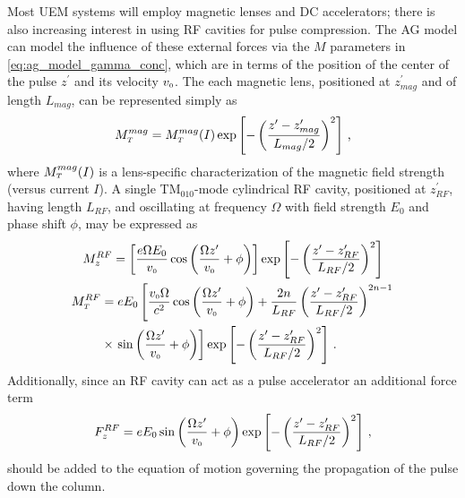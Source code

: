 Most UEM systems will employ magnetic lenses and DC accelerators; there is also increasing interest in using RF cavities for pulse compression.
The AG model can model the influence of these external forces via the $M$ parameters in \ref{eq:ag_model_gamma_conc}, which are in terms of the position of the center of the pulse $z^{\prime}$ and its velocity $v_{{\scriptscriptstyle 0}}$.
The each magnetic lens, positioned at $z_{mag}^{\prime}$ and of length $L_{mag}$, can be represented simply as 
\begin{equation}
  M_{{\scriptscriptstyle T}}^{mag} = M_{{\scriptscriptstyle T}}^{mag}(I) \exp \left [ - \left (  \frac{ z^{\prime} - z_{mag}^{\prime} }{ L_{mag} / 2 } \right )^{ 2 } \right ] \,\text{,}
\end{equation}
where $M_{{\scriptscriptstyle T}}^{mag}(I)$ is a lens-specific characterization of the magnetic field strength (versus current $I$).
A single TM$_{010}$-mode cylindrical RF cavity, positioned at $z_{RF}^{\prime}$, having length $L_{RF}$, and oscillating at frequency $\Omega$ with field strength $E_{0}$ and phase shift $\phi$, may be expressed as
\begin{gather}
  M_{z}^{RF} = \left [ \frac{ e \Omega E_{0} }{ v_{{\scriptscriptstyle 0}} } \cos \left ( \frac{ \Omega z^{\prime} }{ v_{{\scriptscriptstyle 0}} } + \phi \right ) \right ] \exp \left [ - \left (  \frac{ z^{\prime} - z_{RF}^{\prime} }{ L_{RF} / 2 } \right )^{ 2 } \right ] \\
  \begin{aligned}
  M_{{\scriptscriptstyle T}}^{RF} &= e E_{0} \left [ \frac{ v_{{\scriptscriptstyle 0}} \Omega }{c^{2}} \cos \left ( \frac{ \Omega z^{\prime} }{ v_{{\scriptscriptstyle 0}} } + \phi \right ) + \frac{2 n}{L_{RF}} \left ( \frac{z^{\prime} - z^{\prime}_{RF}}{L_{RF} / 2} \right )^{2 n - 1} \right. \\ & \times \left. \sin \left ( \frac{ \Omega z^{\prime} }{ v_{{\scriptscriptstyle 0}} } + \phi \right )
   \right ] \exp \left [ - \left (  \frac{ z^{\prime} - z_{RF}^{\prime} }{ L_{RF} / 2 } \right )^{ 2 } \right ] \,\text{.}
  \end{aligned}
\end{gather}
Additionally, since an RF cavity can act as a pulse accelerator an additional force term
\begin{equation}
  F_{z}^{RF} = e E_{0} \sin \left ( \frac{ \Omega z^{\prime} }{ v_{{\scriptscriptstyle 0}} } + \phi \right ) \exp \left [ - \left (  \frac{ z^{\prime} - z_{RF}^{\prime} }{ L_{RF} / 2 } \right )^{ 2 } \right ] \, \text{,}
\end{equation}
should be added to the equation of motion governing the propagation of the pulse down the column.
